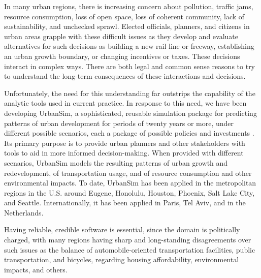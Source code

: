 \documentclass{sig-alternate}
\begin{document}
In many urban regions, there is increasing concern 
about pollution, traffic jams,
resource consumption, loss of open space, loss of coherent community, lack of
sustainability, and unchecked sprawl.  Elected officials, planners, and
citizens in urban areas grapple with these difficult issues as they develop
and evaluate alternatives for such decisions as building a new rail line or
freeway, establishing an urban growth boundary, or changing incentives or
taxes.  These decisions interact in complex ways.  There are both legal and
common sense reasons to try to understand the long-term consequences of these
interactions and decisions.

Unfortunately, the need for this understanding far outstrips
the capability of the analytic tools used in current practice.  In response
to this need, we have been developing UrbanSim, a sophisticated, reusable
simulation package for predicting patterns of urban development for periods
of twenty years or more, under different possible scenarios, each a package
of possible policies and investments 
\cite{waddell-japa-2002,waddell-nse-2003}.  Its
primary purpose is to provide urban planners and other stakeholders with
tools to aid in more informed decision-making.  When provided with
different scenarios,
UrbanSim models the resulting patterns of urban growth and redevelopment,
of transportation usage, and of resource consumption and other
environmental impacts.  To date, UrbanSim has been applied in the
metropolitan regions in the U.S. around Eugene,
Honolulu, Houston, Phoenix, Salt Lake City, and Seattle.
Internationally, it has
been applied in Paris, Tel Aviv, and in the Netherlands.

Having reliable, credible software is essential, since
the domain is politically charged, with many regions having sharp and
long-standing disagreements over such issues as the balance of
automobile-oriented transportation facilities, public transportation, and
bicycles, regarding housing affordability, environmental impacts, and
others.  
\end{document}
